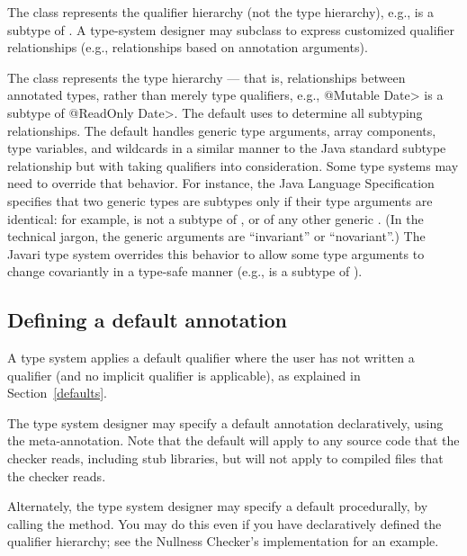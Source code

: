 The  class represents the qualifier hierarchy (not the
type hierarchy), e.g., 
is a subtype of .  A type-system designer may subclass
 to express customized qualifier
relationships (e.g., relationships based on annotation
arguments).

The  class represents the type hierarchy ---
that is, relationships between
annotated types, rather than merely type qualifiers, e.g., \<@Mutable
Date> is a subtype of \<@ReadOnly Date>.  The default  uses
 to determine all subtyping relationships.
The default  handles
generic type arguments, array components, type variables, and
wildcards in a similar manner to the Java standard subtype
relationship but with taking qualifiers into consideration.  Some type
systems may need to override that behavior.  For instance, the Java
Language Specification specifies that two generic types are subtypes only
if their type arguments are identical:  for example,
 is not a subtype of , or of any other
generic .
(In the technical jargon, the generic arguments are ``invariant'' or ``novariant''.)
The Javari type system overrides this
behavior to allow some type arguments to change covariantly in a type-safe
manner (e.g.,
 is a subtype of ).


\subsection{Defining a default annotation\label{typesystem-defaults}}

A type system applies a default qualifier where the user has not written a
qualifier (and no implicit qualifier is applicable), as explained in
Section~\ref{defaults}.

The type system designer may specify a default annotation declaratively,
using the 
meta-annotation.
Note that the default will apply to any source code that the checker reads,
including stub libraries, but will not apply to compiled 
files that the checker reads.

\begin{sloppypar}
Alternately, the type system designer may specify a default procedurally,
by calling the
method.  You may do this even if you have declaratively defined the
qualifier hierarchy; see the Nullness Checker's implementation for an
example.
\end{sloppypar}


